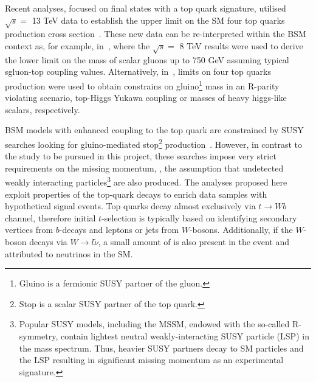 \textcolor{\mycolor}{
Recent analyses, focused on final states with a top quark signature, utilised $\sqrt{s}=$ 13 TeV data to establish the upper limit on the SM four top quarks production cross section~\cite{Aaboud:2017faq,Sirunyan:2017roi,Sirunyan:2017tep}. These new data can be re-interpreted within the BSM context as, for example, in~\cite{Beck:2015cga}, where %
the $\sqrt{s}=$ 8 TeV results were used to derive the lower limit on the mass of scalar gluons up to 750 GeV assuming typical sgluon-top coupling values. Alternatively, in~\cite{Aaboud:2017faq,Sirunyan:2017tep,Cao:2016wib}, limits on four top quarks production were used to obtain constrains on gluino\footnote{Gluino is a fermionic SUSY partner of the gluon.} mass in an R-parity violating scenario, top-Higgs Yukawa coupling or masses of heavy higgs-like scalars, respectively.}

\textcolor{\mycolor}{%
BSM models with enhanced coupling to the top quark are constrained by SUSY searches looking for gluino-mediated stop\footnote{Stop is a scalar SUSY partner of the top quark.} production~\cite{Sirunyan:2017uyt}. However, in contrast to the study to be pursued in this project, these searches impose very strict requirements on the missing momentum, \misspt, the assumption that undetected weakly interacting particles\footnote{Popular SUSY models, including the MSSM, endowed with the so-called R-symmetry, contain lightest neutral weakly-interacting SUSY particle (LSP) in the mass spectrum. Thus, heavier SUSY partners decay to SM particles and the LSP resulting in significant missing momentum as an experimental signature.} are also produced.}
\textcolor{\mycolor}{%
The analyses proposed here exploit properties of the top-quark decays to enrich data samples with hypothetical signal events. Top quarks decay almost exclusively via $t \rightarrow Wb$ channel, therefore initial $t$-selection is typically based on identifying secondary vertices from $b$-decays and leptons or jets from $W$-bosons. Additionally, if the $W$-boson decays via $W\rightarrow l\tilde{\nu}$, a small amount of \misspt is also present in the event and attributed to neutrinos in the SM. }

